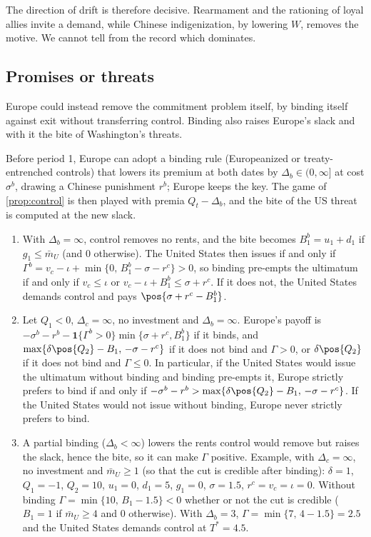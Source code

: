 The direction of drift is therefore decisive. Rearmament and the rationing of loyal allies invite a demand, while Chinese indigenization, by lowering $W$, removes the motive. We cannot tell from the record which dominates.

\subsection{Promises or threats}\label{sec:bind}

Europe could instead remove the commitment problem itself, by binding itself against exit without transferring control. Binding also raises Europe's slack and with it the bite of Washington's threats.

\begin{remark}\label{rem:bind}
Before period 1, Europe can adopt a binding rule (Europeanized or treaty-entrenched controls) that lowers its premium at both dates by $\Delta_b\in(0,\infty]$ at cost $\sigma^b$, drawing a Chinese punishment $r^b$; Europe keeps the key. The game of \cref{prop:control} is then played with premia $Q_t-\Delta_b$, and the bite of the US threat is computed at the new slack.
\begin{enumerate}[label=(\alph*)]
\item With $\Delta_b=\infty$, control removes no rents, and the bite becomes $B_1^b=u_1+d_1$ if $g_1\le\bar m_U$ (and $0$ otherwise). The United States then issues if and only if $\Gamma^b=v_c-\iota+\min\{0,\,B_1^b-\sigma-r^c\}>0$, so binding pre-empts the ultimatum if and only if $v_c\le\iota$ or $v_c-\iota+B_1^b\le\sigma+r^c$. If it does not, the United States demands control and pays $\pos{\sigma+r^c-B_1^b}$.
\item Let $Q_1<0$, $\Delta_c=\infty$, no investment and $\Delta_b=\infty$. Europe's payoff is $-\sigma^b-r^b-\mathbf 1\{\Gamma^b>0\}\min\{\sigma+r^c,B_1^b\}$ if it binds, and $\max\{\delta\pos{Q_2}-B_1,\,-\sigma-r^c\}$ if it does not bind and $\Gamma>0$, or $\delta\pos{Q_2}$ if it does not bind and $\Gamma\le 0$. In particular, if the United States would issue the ultimatum without binding and binding pre-empts it, Europe strictly prefers to bind if and only if $-\sigma^b-r^b>\max\{\delta\pos{Q_2}-B_1,\,-\sigma-r^c\}$. If the United States would not issue without binding, Europe never strictly prefers to bind.
\item A partial binding ($\Delta_b<\infty$) lowers the rents control would remove but raises the slack, hence the bite, so it can make $\Gamma$ positive. Example, with $\Delta_c=\infty$, no investment and $\bar m_U\ge 1$ (so that the cut is credible after binding): $\delta=1$, $Q_1=-1$, $Q_2=10$, $u_1=0$, $d_1=5$, $g_1=0$, $\sigma=1.5$, $r^c=v_c=\iota=0$. Without binding $\Gamma=\min\{10,\,B_1-1.5\}<0$ whether or not the cut is credible ($B_1=1$ if $\bar m_U\ge 4$ and $0$ otherwise). With $\Delta_b=3$, $\Gamma=\min\{7,\,4-1.5\}=2.5$ and the United States demands control at $T^*=4.5$.

\end{enumerate}
\end{remark}
